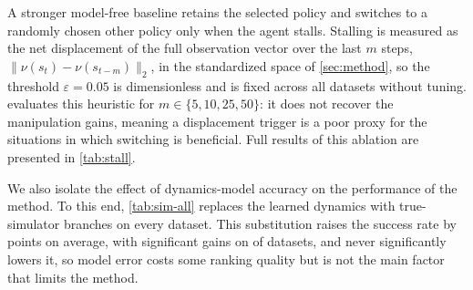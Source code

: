 \documentclass{article}
\theoremstyle{plain}
\theoremstyle{definition}
\theoremstyle{plain}
\newcommand{\wmpa}{\textsc{WMPA}}
\begin{document}
A stronger model-free baseline retains the selected policy and switches to a randomly chosen other policy only when the agent stalls. Stalling is measured as the net displacement of the full observation vector over the last $m$ steps, $\|\nu(s_t)-\nu(s_{t-m})\|_2$, in the standardized space of \cref{sec:method}, so the threshold $\varepsilon=0.05$ is dimensionless and is fixed across all datasets without tuning.  evaluates this heuristic for $m\in\{5,10,25,50\}$: it does not recover the manipulation gains, meaning a displacement trigger is a poor proxy for the situations in which switching is beneficial. Full results of this ablation are presented in \cref{tab:stall}.


We also isolate the effect of dynamics-model accuracy on the performance of the method. To this end, \cref{tab:sim-all} replaces the learned dynamics with true-simulator branches on every dataset. This substitution raises the success rate by \AblMeanDeltaSimSel{} points on average, with significant gains on \AblNumUpSimSel{} of \AblNumEnvsSimSel{} datasets, and never significantly lowers it, so model error costs some ranking quality but is not the main factor that limits the method.

\end{document}
